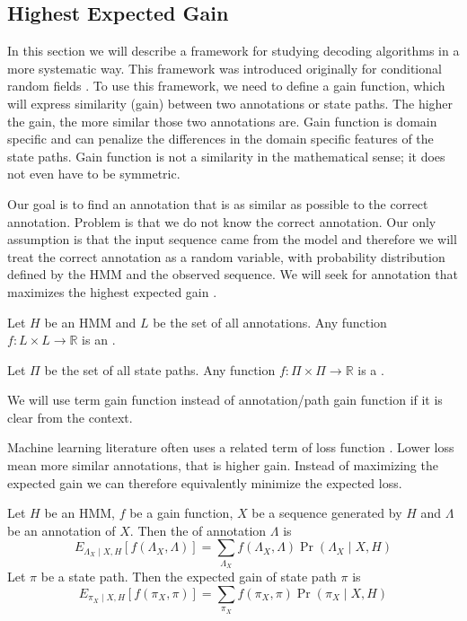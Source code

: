\subsection{Highest Expected Gain}

\label{SECTION:HEG}

In this section we will describe a framework for studying decoding algorithms in
a more systematic way. This framework was introduced  originally for
conditional random fields \cite{Gross2007}.  To use this framework, we need to
define a gain function, which will express similarity (gain) between two
annotations or state paths. The higher the gain, the more similar those two
annotations are. Gain function is domain specific and can penalize the differences
in the domain specific features of the state paths.  Gain function is not a
similarity in the mathematical sense; it does not even have to be symmetric.

Our goal is to find an annotation that is as similar as possible to the correct
annotation. Problem is that we do not know the correct annotation. Our only
assumption is that the input sequence came from the model and therefore we will
treat the correct annotation as a random variable, with probability distribution
defined by the HMM and the observed sequence. We will seek for annotation that
maximizes the highest expected gain \cite{Nanasi2010,Nanasi2010mgr}.

\begin{definition}
Let $H$ be an HMM and $L$ be the set of all annotations. Any function
$f:L\times L\to \mathbb{R}$ is an .

Let $\Pi$ be the set of all state paths. Any function $f:\Pi\times
\Pi\to\mathbb{R}$ is a .
\label{DEFINITION:GAINFUNCTION}
\end{definition}

\begin{note}
We will use term gain function instead of annotation/path gain function if it is
clear from the context.

Machine learning literature often uses a related term of loss function
\cite{Lember2010}. Lower loss mean more similar annotations, that is higher gain. Instead
of maximizing the expected gain we can therefore equivalently minimize the expected
loss.
\end{note}

\begin{definition}
Let $H$ be an HMM, $f$ be a gain function, $X$ be a sequence generated by $H$ and
$\Lambda$ be an annotation of $X$. Then the  of annotation
$\Lambda$ is 
\begin{equation}
E_{\Lambda_X\mid X,H}[f(\Lambda_X,\Lambda)] =
\sum_{\Lambda_X}f(\Lambda_X,\Lambda)\Pr\left(\Lambda_X\mid X,H\right)
\end{equation}
Let $\pi$ be a state path. Then the expected gain of state path $\pi$ is 
\begin{equation}
E_{\pi_X\mid X,H}[f(\pi_X,\pi)] =
\sum_{\pi_X}f(\pi_X,\pi)\Pr\left(\pi_X\mid X,H\right)
\end{equation}
\end{definition}


